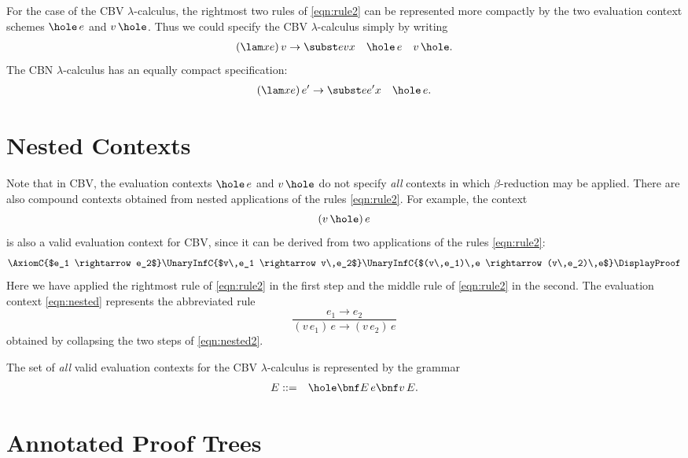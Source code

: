 For the case of the CBV $\lambda$-calculus, the rightmost two rules of \eqref{eqn:rule2} can be represented more compactly by the two evaluation context schemes $\hole\,e$ and $v\,\hole$. Thus we could specify the CBV $\lambda$-calculus simply by writing
\begin{align*}
 (\lam xe)\,v \rightarrow \subst evx && \hole\,e && v\,\hole.
\end{align*}
The CBN $\lambda$-calculus has an equally compact specification:
\begin{align*}
 (\lam xe)\,e' \rightarrow \subst e{e'}x && \hole\,e.
\end{align*}

\section{Nested Contexts}

Note that in CBV, the evaluation contexts $\hole\,e$ and $v\,\hole$ do not specify \emph{all} contexts in which $\beta$-reduction may be applied. There are also compound contexts obtained from nested applications of the rules \eqref{eqn:rule2}. For example, the context
\begin{equation}
 (v\,\hole)\,e\label{eqn:nested}
\end{equation}
is also a valid evaluation context for CBV, since it can be derived from two applications of the rules \eqref{eqn:rule2}:
\begin{equation}
\AxiomC{$e_1 \rightarrow e_2$}
\UnaryInfC{$v\,e_1 \rightarrow v\,e_2$}
\UnaryInfC{$(v\,e_1)\,e \rightarrow (v\,e_2)\,e$}
\DisplayProof
\label{eqn:nested2}
\end{equation}
Here we have applied the rightmost rule of \eqref{eqn:rule2} in the first step and the middle rule of \eqref{eqn:rule2} in the second. The evaluation context \eqref{eqn:nested} represents the abbreviated rule
\[
 \frac
 {e_1 \rightarrow e_2}
 {(v\,e_1)\,e \rightarrow (v\,e_2)\,e}
\]
obtained by collapsing the two steps of \eqref{eqn:nested2}.

The set of \emph{all} valid evaluation contexts for the CBV $\lambda$-calculus is represented by the grammar
\begin{eqnarray*}
 E &::=& \hole \bnf E\,e \bnf v\,E.
\end{eqnarray*}

\section{Annotated Proof Trees}

